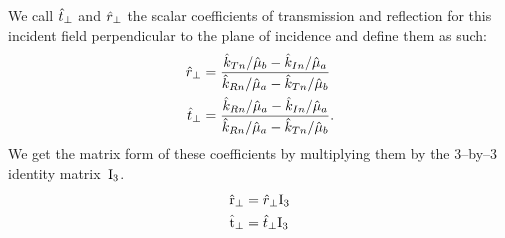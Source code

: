 We call $\hat{t}_\perp$ and $\hat{r}_\perp$ the scalar coefficients of transmission and reflection for this incident field perpendicular to the plane of incidence and define them as such:
\begin{align}
    \hat{r}_\perp 
    &=
    \frac{
        \hat{k}_{T n} / \hat{\mu}_b - \hat{k}_{I n} / \hat{\mu}_a
    }{
        \hat{k}_{R n} / \hat{\mu}_a - \hat{k}_{T n} / \hat{\mu}_b
    }
    \label{eq:complex_fresnel_rs}
    \\
    \hat{t}_\perp 
    &=
    \frac{
        \hat{k}_{R n} / \hat{\mu}_a - \hat{k}_{I n} / \hat{\mu}_a
    }{
        \hat{k}_{R n} / \hat{\mu}_a - \hat{k}_{T n} / \hat{\mu}_b
    }
    \text{.}
    \label{eq:complex_fresnel_ts}
\end{align}
We get the matrix form of these coefficients by multiplying them by the 3--by--3 identity matrix~$\mathrm{I}_3$.
\begin{align}
    \hat{\mathrm{r}}_\perp &= \hat{r}_\perp \mathrm{I}_3
    \\
    \hat{\mathrm{t}}_\perp &= \hat{t}_\perp \mathrm{I}_3
\end{align}


